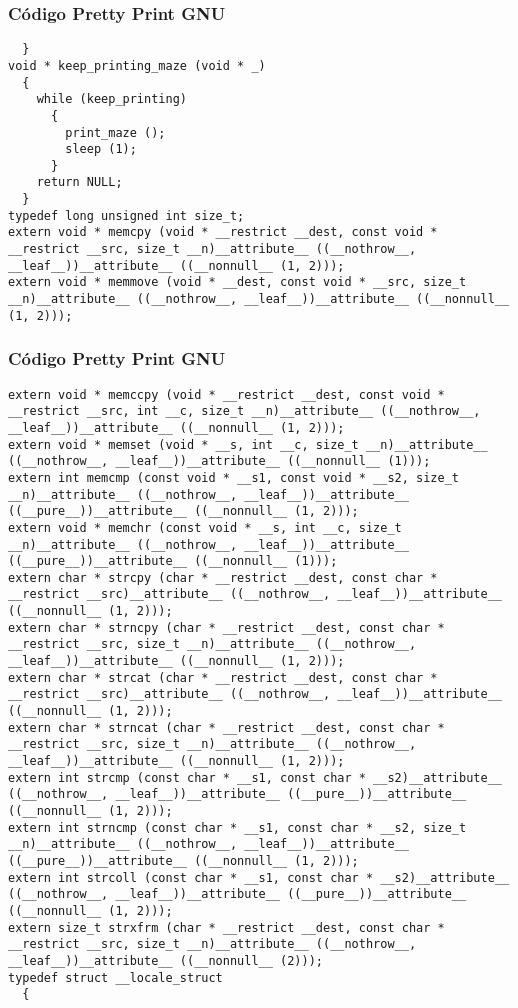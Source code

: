 \documentclass{beamer}
\begin{document}
\begin{frame}[fragile]
\frametitle{C\'odigo Pretty Print GNU}
\begin{verbatim}
  }
void * keep_printing_maze (void * _)
  {
    while (keep_printing)
      {
        print_maze ();
        sleep (1);
      }
    return NULL;
  }
typedef long unsigned int size_t;
extern void * memcpy (void * __restrict __dest, const void * __restrict __src, size_t __n)__attribute__ ((__nothrow__, __leaf__))__attribute__ ((__nonnull__ (1, 2)));
extern void * memmove (void * __dest, const void * __src, size_t __n)__attribute__ ((__nothrow__, __leaf__))__attribute__ ((__nonnull__ (1, 2)));
\end{verbatim}
\end{frame}
\begin{frame}[fragile]
\frametitle{C\'odigo Pretty Print GNU}
\begin{verbatim}
extern void * memccpy (void * __restrict __dest, const void * __restrict __src, int __c, size_t __n)__attribute__ ((__nothrow__, __leaf__))__attribute__ ((__nonnull__ (1, 2)));
extern void * memset (void * __s, int __c, size_t __n)__attribute__ ((__nothrow__, __leaf__))__attribute__ ((__nonnull__ (1)));
extern int memcmp (const void * __s1, const void * __s2, size_t __n)__attribute__ ((__nothrow__, __leaf__))__attribute__ ((__pure__))__attribute__ ((__nonnull__ (1, 2)));
extern void * memchr (const void * __s, int __c, size_t __n)__attribute__ ((__nothrow__, __leaf__))__attribute__ ((__pure__))__attribute__ ((__nonnull__ (1)));
extern char * strcpy (char * __restrict __dest, const char * __restrict __src)__attribute__ ((__nothrow__, __leaf__))__attribute__ ((__nonnull__ (1, 2)));
extern char * strncpy (char * __restrict __dest, const char * __restrict __src, size_t __n)__attribute__ ((__nothrow__, __leaf__))__attribute__ ((__nonnull__ (1, 2)));
extern char * strcat (char * __restrict __dest, const char * __restrict __src)__attribute__ ((__nothrow__, __leaf__))__attribute__ ((__nonnull__ (1, 2)));
extern char * strncat (char * __restrict __dest, const char * __restrict __src, size_t __n)__attribute__ ((__nothrow__, __leaf__))__attribute__ ((__nonnull__ (1, 2)));
extern int strcmp (const char * __s1, const char * __s2)__attribute__ ((__nothrow__, __leaf__))__attribute__ ((__pure__))__attribute__ ((__nonnull__ (1, 2)));
extern int strncmp (const char * __s1, const char * __s2, size_t __n)__attribute__ ((__nothrow__, __leaf__))__attribute__ ((__pure__))__attribute__ ((__nonnull__ (1, 2)));
extern int strcoll (const char * __s1, const char * __s2)__attribute__ ((__nothrow__, __leaf__))__attribute__ ((__pure__))__attribute__ ((__nonnull__ (1, 2)));
extern size_t strxfrm (char * __restrict __dest, const char * __restrict __src, size_t __n)__attribute__ ((__nothrow__, __leaf__))__attribute__ ((__nonnull__ (2)));
typedef struct __locale_struct
  {
    \end{verbatim}
\end{frame}
\end{document}
